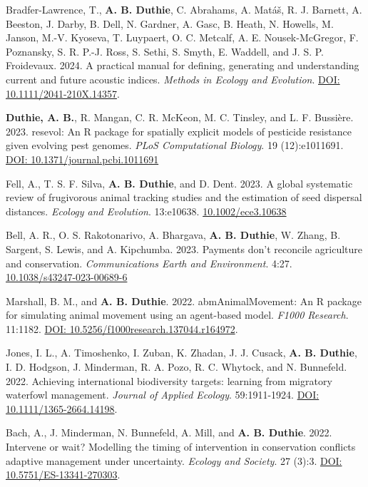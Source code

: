 \documentclass[letterpaper]{article}
\begin{document}
\begin{etaremune}
\item Bradfer-Lawrence, T., {\bf A. B. Duthie}, C. Abrahams, A. Mat\'{a}\v{s}, R. J. Barnett, A. Beeston, J. Darby, B. Dell, N. Gardner, A. Gasc, B. Heath, N. Howells, M. Janson, M.-V. Kyoseva, T. Luypaert, O. C. Metcalf, A. E. Nousek-McGregor, F. Poznansky, S. R. P.-J. Ross, S. Sethi, S. Smyth, E. Waddell, and J. S. P. Froidevaux. 2024. A practical manual for defining, generating and understanding current and future acoustic indices. {\it Methods in Ecology and Evolution}. \href{https://besjournals.onlinelibrary.wiley.com/doi/10.1111/2041-210X.14357}{DOI: 10.1111/2041-210X.14357}.
\item {\bf Duthie, A. B.}, R. Mangan, C. R. McKeon, M. C. Tinsley, and L. F. Bussi\`{e}re. 2023. resevol: An R package for spatially explicit models of pesticide resistance given evolving pest genomes. {\it PLoS Computational Biology}. 19 (12):e1011691. \href{https://journals.plos.org/ploscompbiol/article?id=10.1371/journal.pcbi.1011691}{DOI: 10.1371/journal.pcbi.1011691}
\item Fell, A., T. S. F. Silva, {\bf A. B. Duthie}, and D. Dent. 2023. A global systematic review of frugivorous animal tracking studies and the estimation of seed dispersal distances. {\it Ecology and Evolution}. 13:e10638. \href{https://onlinelibrary.wiley.com/doi/10.1002/ece3.10638}{10.1002/ece3.10638}
\item Bell, A. R., O. S. Rakotonarivo, A. Bhargava, {\bf A. B. Duthie}, W. Zhang, B. Sargent, S. Lewis, and A. Kipchumba. 2023. Payments don't reconcile agriculture and conservation. {\it Communications Earth and Environment}. 4:27. \href{https://www.nature.com/articles/s43247-023-00689-6}{10.1038/s43247-023-00689-6}
\item Marshall, B. M., and {\bf A. B. Duthie}. 2022. abmAnimalMovement: An R package for simulating animal movement using an agent-based model. {\it F1000 Research}. 11:1182. \newline \href{https://doi.org/10.5256/f1000research.137044.r164972}{DOI: 10.5256/f1000research.137044.r164972}.
\item Jones, I. L., A. Timoshenko, I. Zuban, K. Zhadan, J. J. Cusack, {\bf A. B. Duthie}, I. D. Hodgson, J. Minderman, R. A. Pozo, R. C. Whytock, and N. Bunnefeld. 2022. Achieving international biodiversity targets: learning from migratory waterfowl management. {\it Journal of Applied Ecology}. 59:1911-1924. \href{https://besjournals.onlinelibrary.wiley.com/doi/10.1111/1365-2664.14198}{DOI: 10.1111/1365-2664.14198}.
\item Bach, A., J. Minderman, N. Bunnefeld, A. Mill, and {\bf A. B. Duthie}. 2022. Intervene or wait? Modelling the timing of intervention in conservation conflicts adaptive management under uncertainty. {\it Ecology and Society}. 27 (3):3. \href{https://ecologyandsociety.org/vol27/iss3/art3/}{DOI: 10.5751/ES-13341-270303}.

\end{etaremune}
\end{document}
